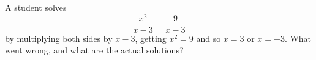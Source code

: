 A student solves
\[
\dfrac{x^2}{x-3}=\dfrac{9}{x-3}
\]
by multiplying both sides by $x-3$, getting $x^2=9$ and so $x=3$ or $x=-3$. What went wrong, and what are the actual solutions?
